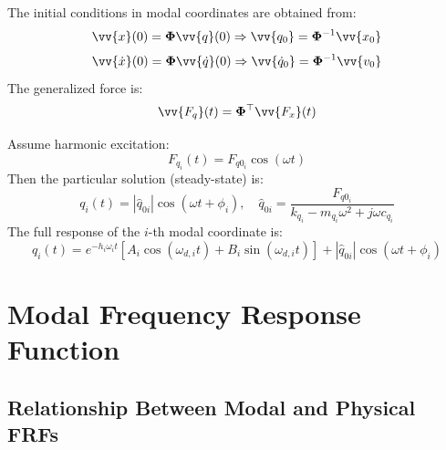 The initial conditions in modal coordinates are obtained from:
\[
\vv{x}(0) = \boldsymbol{\Phi} \vv{q}(0) \Rightarrow \vv{q_0} = \boldsymbol{\Phi}^{-1} \vv{x_0}
\]
\[
\vv{\dot{x}}(0) = \boldsymbol{\Phi} \vv{\dot{q}}(0) \Rightarrow \vv{\dot{q}_0} = \boldsymbol{\Phi}^{-1} \vv{v_0}
\]
The generalized force is:
\[
\vv{F_q}(t) = \boldsymbol{\Phi}^\top \vv{F_x}(t)
\]

Assume harmonic excitation:
\[
F_{q_i}(t) = F_{q0_i} \cos(\omega t)
\]
Then the particular solution (steady-state) is:
\[
q_i(t) = |\hat{q}_{0i}| \cos(\omega t + \phi_i), \quad
\hat{q}_{0i} = \frac{F_{q0_i}}{k_{q_i} - m_{q_i} \omega^2 + j \omega c_{q_i}}
\]
The full response of the \( i \)-th modal coordinate is:
\[
q_i(t) = e^{-h_i \omega_i t} \left[ A_i \cos(\omega_{d,i} t) + B_i \sin(\omega_{d,i} t) \right]
+ |\hat{q}_{0i}| \cos(\omega t + \phi_i)
\]

\section{Modal Frequency Response Function}

\subsection{Relationship Between Modal and Physical FRFs}

